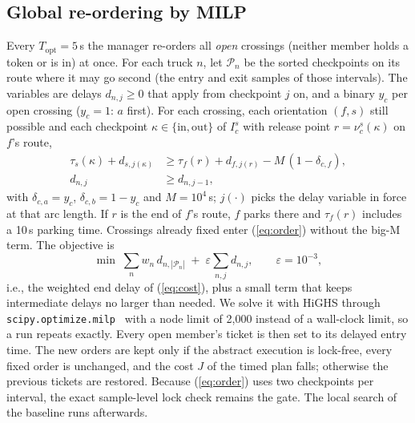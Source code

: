 \documentclass[conference]{IEEEtran}
\begin{document}
\subsection{Global re-ordering by MILP}
\label{sec:milp}
Every $T_{\mathrm{opt}}=5$\,s the manager re-orders all \emph{open} crossings
(neither member holds a token or is in) at once. For each truck $n$, let
$\mathcal{P}_n$ be the sorted checkpoints on its route where it may go second
(the entry and exit samples of those intervals). The variables are delays
$d_{n,j}\ge0$ that apply from checkpoint $j$ on, and a binary $y_c$ per open
crossing ($y_c=1$: $a$ first). For each crossing, each orientation $(f,s)$
still possible and each checkpoint $\kappa\in\{\mathrm{in},\mathrm{out}\}$
of $I_c^s$ with release point $r=\nu_c^s(\kappa)$ on $f$'s route,
\begin{align}
\tau_s(\kappa)+d_{s,j(\kappa)} &\ge \tau_f(r)+d_{f,j(r)}-M\,(1-\delta_{c,f}),
\label{eq:order}\\
d_{n,j} &\ge d_{n,j-1}, \label{eq:mono}
\end{align}
with $\delta_{c,a}=y_c$, $\delta_{c,b}=1-y_c$ and $M=10^4$\,s; $j(\cdot)$
picks the delay variable in force at that arc length. If $r$ is the end of
$f$'s route, $f$ parks there and $\tau_f(r)$ includes a 10\,s parking time.
Crossings already fixed enter (\ref{eq:order}) without the big-M term. The
objective is
\begin{equation}
\min\;\sum_n w_n\, d_{n,|\mathcal{P}_n|}\;+\;\varepsilon\sum_{n,j} d_{n,j},
\qquad \varepsilon=10^{-3},
\label{eq:obj}
\end{equation}
i.e., the weighted end delay of (\ref{eq:cost}), plus a small term that keeps
intermediate delays no larger than needed. We solve it with HiGHS through
\texttt{scipy.optimize.milp}~\cite{huangfu2018,virtanen2020} with a node
limit of 2{,}000 instead of a wall-clock limit, so a run repeats exactly.
Every open member's ticket is then set to its delayed entry time. The new
orders are kept only if the abstract execution is lock-free, every fixed order
is unchanged, and the cost $J$ of the timed plan falls; otherwise the previous
tickets are restored. Because (\ref{eq:order}) uses two checkpoints per
interval, the exact sample-level lock check remains the gate. The local search
of the baseline runs afterwards.
\end{document}

